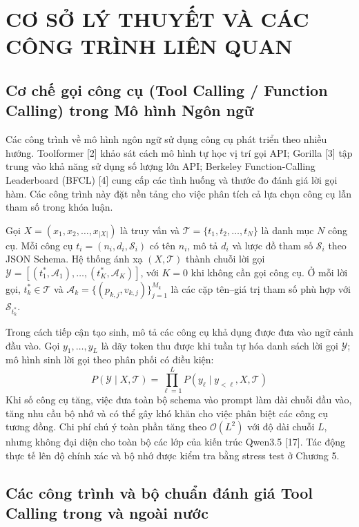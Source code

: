 \chapter{CƠ SỞ LÝ THUYẾT VÀ CÁC CÔNG TRÌNH LIÊN QUAN}

\section{Cơ chế gọi công cụ (Tool Calling / Function Calling) trong Mô hình Ngôn ngữ}

Các công trình về mô hình ngôn ngữ sử dụng công cụ phát triển theo nhiều hướng. Toolformer [2] khảo sát cách mô hình tự học vị trí gọi API; Gorilla [3] tập trung vào khả năng sử dụng số lượng lớn API; Berkeley Function-Calling Leaderboard (BFCL) [4] cung cấp các tình huống và thước đo đánh giá lời gọi hàm. Các công trình này đặt nền tảng cho việc phân tích cả lựa chọn công cụ lẫn tham số trong khóa luận.

Gọi $X = (x_1, x_2, \dots, x_{|X|})$ là truy vấn và $\mathcal{T} = \{t_1, t_2, \dots, t_N\}$ là danh mục $N$ công cụ. Mỗi công cụ $t_i = (n_i, d_i, \mathcal{S}_i)$ có tên $n_i$, mô tả $d_i$ và lược đồ tham số $\mathcal{S}_i$ theo JSON Schema. Hệ thống ánh xạ $(X, \mathcal{T})$ thành chuỗi lời gọi $\mathcal{Y} = [(t^*_1, \mathcal{A}_1), \dots, (t^*_K, \mathcal{A}_K)]$, với $K=0$ khi không cần gọi công cụ. Ở mỗi lời gọi, $t^*_k \in \mathcal{T}$ và $\mathcal{A}_k = \{(p_{k,j}, v_{k,j})\}_{j=1}^{M_k}$ là các cặp tên–giá trị tham số phù hợp với $\mathcal{S}_{t^*_k}$.

Trong cách tiếp cận tạo sinh, mô tả các công cụ khả dụng được đưa vào ngữ cảnh đầu vào. Gọi $y_1,\dots,y_L$ là dãy token thu được khi tuần tự hóa danh sách lời gọi $\mathcal{Y}$; mô hình sinh lời gọi theo phân phối có điều kiện:
$$P(\mathcal{Y} \mid X, \mathcal{T}) = \prod_{\ell=1}^{L} P(y_{\ell} \mid y_{<\ell}, X, \mathcal{T})$$
Khi số công cụ tăng, việc đưa toàn bộ schema vào prompt làm dài chuỗi đầu vào, tăng nhu cầu bộ nhớ và có thể gây khó khăn cho việc phân biệt các công cụ tương đồng. Chi phí chú ý toàn phần tăng theo $\mathcal{O}(L^2)$ với độ dài chuỗi $L$, nhưng không đại diện cho toàn bộ các lớp của kiến trúc Qwen3.5 [17]. Tác động thực tế lên độ chính xác và bộ nhớ được kiểm tra bằng stress test ở Chương 5.

\section{Các công trình và bộ chuẩn đánh giá Tool Calling trong và ngoài nước}

